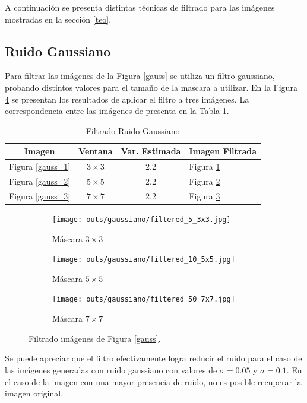 \documentclass[
  letterpaper,
  twocolumn,
  9pt,
  journal,
  final]{IEEEtran}
\begin{document}
A continuación se presenta distintas técnicas de filtrado para las imágenes mostradas en la sección \ref{teo}.

\subsection{Ruido Gaussiano}

Para filtrar las imágenes de la Figura \ref{gauss} se utiliza un filtro gaussiano, probando distintos valores para el tamaño de la mascara a utilizar. En la Figura \ref{gauss_filtrado} se presentan los resultados de aplicar el filtro a tres imágenes. La correspondencia entre las imágenes de presenta en la Tabla \ref{tab_gauss}.

\begin{table}[!tbh]
  \centering
  \caption{Filtrado Ruido Gaussiano} \label{tab_gauss}
  \begin{tabular}{cccl}
  Imagen & Ventana & Var. Estimada & Imagen Filtrada \\ \hline
  Figura \ref{gauss_1}     & $3\times3$        & 2.2            & Figura \ref{gauss_filtrado_1}               \\
  Figura \ref{gauss_2}     & $5\times5$      & 2.2            & Figura \ref{gauss_filtrado_2}               \\
  Figura \ref{gauss_3}     & $7\times7$      & 2.2            & Figura \ref{gauss_filtrado_3}
  \end{tabular}
\end{table}

\begin{figure}[!tbh]
  \centering
  \begin{subfigure}[b]{.32\linewidth}
    \texttt{[image: outs/gaussiano/filtered\_5\_3x3.jpg]}
    \caption{Máscara $3\times3$}\label{gauss_filtrado_1}
  \end{subfigure}
  \begin{subfigure}[b]{.32\linewidth}
    \texttt{[image: outs/gaussiano/filtered\_10\_5x5.jpg]}
    \caption{Máscara $5\times5$}\label{gauss_filtrado_2}
  \end{subfigure}
  \begin{subfigure}[b]{.32\linewidth}
    \texttt{[image: outs/gaussiano/filtered\_50\_7x7.jpg]}
    \caption{Máscara $7\times7$}\label{gauss_filtrado_3}
  \end{subfigure}
  \caption{Filtrado imágenes de Figura \ref{gauss}.}
  \label{gauss_filtrado}
\end{figure}

Se puede apreciar que el filtro efectivamente logra reducir el ruido para el caso de las imágenes generadas con ruido gaussiano con valores de $\sigma=0.05$ y $\sigma=0.1$. En el caso de la imagen con una mayor presencia de ruido, no es posible recuperar la imagen original.
\end{document}
